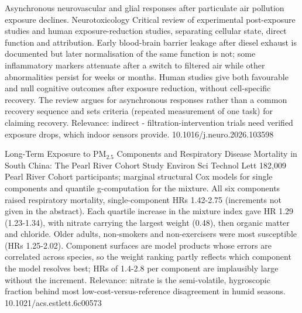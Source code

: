 \documentclass[10pt]{article}
\begin{document}
{Asynchronous neurovascular and glial responses after particulate air pollution exposure declines.}
{Neurotoxicology}
{Critical review of experimental post-exposure studies and human exposure-reduction studies, separating cellular state, direct function and attribution. Early blood-brain barrier leakage after diesel exhaust is documented but later normalisation of the same function is not; some inflammatory markers attenuate after a switch to filtered air while other abnormalities persist for weeks or months. Human studies give both favourable and null cognitive outcomes after exposure reduction, without cell-specific recovery. The review argues for asynchronous responses rather than a common recovery sequence and sets criteria (repeated measurement of one task) for claiming recovery. Relevance: indirect - filtration-intervention trials need verified exposure drops, which indoor sensors provide.}
{10.1016/j.neuro.2026.103598}

\par{}\baselineskip{}\baselineskip
{}

{Long-Term Exposure to PM$_{2.5}$ Components and Respiratory Disease Mortality in South China: The Pearl River Cohort Study}
{Environ Sci Technol Lett}
{182,009 Pearl River Cohort participants; marginal structural Cox models for single components and quantile g-computation for the mixture. All six components raised respiratory mortality, single-component HRs 1.42-2.75 (increments not given in the abstract). Each quartile increase in the mixture index gave HR 1.29 (1.23-1.34), with nitrate carrying the largest weight (0.48), then organic matter and chloride. Older adults, non-smokers and non-exercisers were most susceptible (HRs 1.25-2.02). Component surfaces are model products whose errors are correlated across species, so the weight ranking partly reflects which component the model resolves best; HRs of 1.4-2.8 per component are implausibly large without the increment. Relevance: nitrate is the semi-volatile, hygroscopic fraction behind most low-cost-versus-reference disagreement in humid seasons.}
{10.1021/acs.estlett.6c00573}
\end{document}
